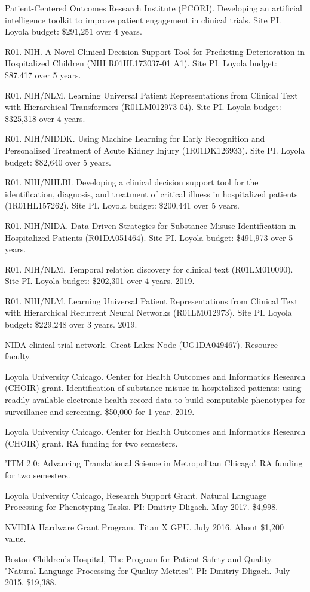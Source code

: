 \documentclass[letterpaper]{article}
\renewenvironment{itemize}{
  \begin{list}{}{
    \setlength{\leftmargin}{1.5em}
  }
}{
  \end{list}
}
\begin{document}
\begin{itemize}
\item Patient-Centered Outcomes Research Institute (PCORI). Developing an artificial intelligence toolkit to improve patient engagement in clinical trials. Site PI. Loyola budget: \$291,251 over 4 years.
\item R01. NIH. A Novel Clinical Decision Support Tool for Predicting Deterioration in Hospitalized Children (NIH R01HL173037-01 A1). Site PI. Loyola budget: \$87,417 over 5 years.
\item R01. NIH/NLM. Learning Universal Patient Representations from Clinical Text with Hierarchical Transformers (R01LM012973-04). Site PI. Loyola budget: \$325,318 over 4 years.
\item R01. NIH/NIDDK. Using Machine Learning for Early Recognition and Personalized Treatment of Acute Kidney Injury (1R01DK126933). Site PI. Loyola budget: \$82,640 over 5 years.
\item R01. NIH/NHLBI. Developing a clinical decision support tool for the identification, diagnosis, and treatment of critical illness in hospitalized patients (1R01HL157262). Site PI. Loyola budget: \$200,441 over 5 years.
\item R01. NIH/NIDA. Data Driven Strategies for Substance Misuse Identification in Hospitalized Patients (R01DA051464). Site PI. Loyola budget: \$491,973 over 5 years.
\item R01. NIH/NLM. Temporal relation discovery for clinical text (R01LM010090). Site PI. Loyola budget: \$202,301 over 4 years. 2019.
\item R01. NIH/NLM. Learning Universal Patient Representations from Clinical Text with Hierarchical Recurrent Neural Networks (R01LM012973). Site PI. Loyola budget: \$229,248 over 3 years. 2019.
\item NIDA clinical trial network. Great Lakes Node (UG1DA049467). Resource faculty.
\item Loyola University Chicago. Center for Health Outcomes and Informatics Research (CHOIR) grant. Identification of substance misuse in hospitalized patients: using readily available electronic health record data to build computable phenotypes for surveillance and screening. \$50,000 for 1 year. 2019.
\item Loyola University Chicago. Center for Health Outcomes and Informatics Research (CHOIR) grant. RA funding for two semesters.
\item 'ITM 2.0: Advancing Translational Science in Metropolitan Chicago'. RA funding for two semesters.
\item Loyola University Chicago, Research Support Grant. Natural Language Processing for Phenotyping Tasks. PI: Dmitriy Dligach. May 2017. \$4,998.
\item NVIDIA Hardware Grant Program. Titan X GPU. July 2016. About \$1,200 value.
\item Boston Children's Hospital, The Program for Patient Safety and Quality. "Natural Language Processing for Quality Metrics''. PI: Dmitriy Dligach. July 2015. \$19,388.
\end{itemize}
\end{document}

